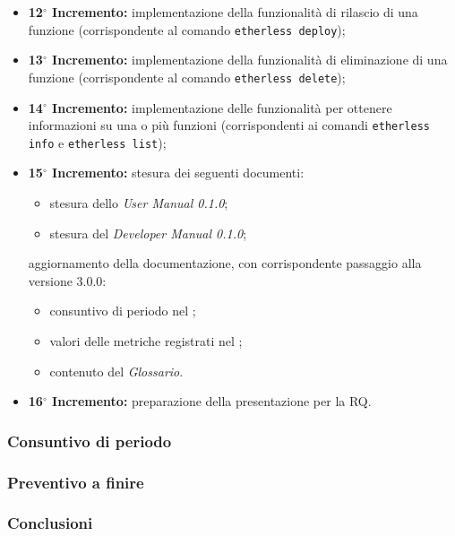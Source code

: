 \begin{itemize}
	\item \textbf{12$^{\circ}$ Incremento:} implementazione della funzionalità di rilascio di una funzione (corrispondente al comando \texttt{etherless deploy});
	\item \textbf{13$^{\circ}$ Incremento:} implementazione della funzionalità di eliminazione di una funzione (corrispondente al comando \texttt{etherless delete});
	\item \textbf{14$^{\circ}$ Incremento:} implementazione delle funzionalità per ottenere informazioni su una o più funzioni (corrispondenti ai comandi \texttt{etherless info} e \texttt{etherless list});
	\item \textbf{15$^{\circ}$ Incremento:} stesura dei seguenti documenti: 
	\begin{itemize}
		\item stesura dello \textit{User Manual 0.1.0}; 
		\item stesura del \textit{Developer Manual 0.1.0}; 
	\end{itemize}
	aggiornamento della documentazione, con corrispondente passaggio alla versione 3.0.0:  
	\begin{itemize}
		\item consuntivo di periodo nel \textit{\PdP{}}; 
		\item valori delle metriche registrati nel \textit{\PdQ{}}; 
		\item contenuto del \textit{Glossario}.  
	\end{itemize}
	 \item \textbf{16$^{\circ}$ Incremento:} preparazione della presentazione per la RQ.
\end{itemize}

\subsubsection{Consuntivo di periodo}
\subsubsection{Preventivo a finire}
\subsubsection{Conclusioni}
